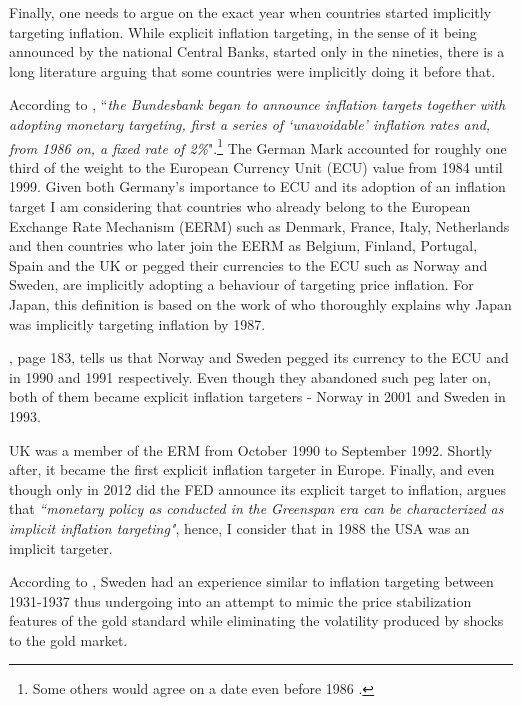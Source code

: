\documentclass[12pt]{article}
\begin{document}
\begin{appendices}

Finally, one needs to argue on the exact year when countries started implicitly targeting inflation. While explicit inflation targeting, in the sense of it being announced by the national Central Banks, started only in the nineties, there is a long literature arguing that some countries were implicitly doing it before that.

According to \cite{vonHagen1999}, ``\textit{the Bundesbank began to announce inflation targets together with adopting monetary targeting, first a series of `unavoidable’ inflation rates and, from 1986 on, a fixed rate of 2\%}".\footnote{Some others would agree on a date even before 1986 \cite{Mishkin2001}.} The German Mark accounted for roughly one third of the weight to the European Currency Unit (ECU) value from 1984 until 1999. Given both Germany's importance to ECU and its adoption of an inflation target I am considering that countries who already belong to the European Exchange Rate Mechanism (EERM) such as Denmark, France, Italy, Netherlands and then countries who later join the EERM as Belgium, Finland, Portugal, Spain and the UK or pegged their currencies to the ECU such as Norway and Sweden, are implicitly adopting a behaviour of targeting price inflation. For Japan, this definition is based on the work of \cite{Jinushi2000} who thoroughly explains why Japan was implicitly targeting inflation by 1987.

\cite{Ungerer1997}, page 183, tells us that Norway and Sweden pegged its currency to the ECU and in 1990 and 1991 respectively. Even though they abandoned such peg later on, both of them became explicit inflation targeters - Norway in 2001 and Sweden in 1993. 

UK was a member of the ERM from October 1990 to September 1992. Shortly after, it became the first explicit inflation targeter in Europe. Finally, and even though only in 2012 did the FED announce its explicit target to inflation, \cite{Goodfriend2004} argues that \textit{``monetary policy as conducted in the Greenspan era can be characterized as implicit inflation targeting"}, hence, I consider that in 1988 the USA was an implicit targeter.

According to \cite{Berg1999}, Sweden had an experience similar to inflation targeting between 1931-1937 thus undergoing into an attempt to mimic the price stabilization features of the gold standard while eliminating the volatility produced by shocks to the gold market. 


\end{appendices}
\end{document}
